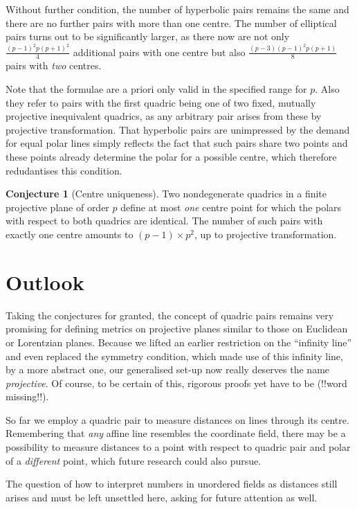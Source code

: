 \documentclass[12pt,english,paper=a4,DIV=12,headings=small,numbers=noenddot,parskip=half]{scrartcl}
\theoremstyle{definition}
\newtheorem{conj}{Conjecture}
\begin{document}
Without further condition, the number of hyperbolic pairs remains the same and there are no further pairs with more than one centre. The number of elliptical pairs turns out to be significantly larger, as there now are not only $\frac{(p-1)^2p(p+1)^2}{4}$ additional pairs with one centre but also $\frac{(p-3)(p-1)^2p(p+1)}{8}$ pairs with \emph{two} centres.

Note that the formulae are a priori only valid in the specified range for $p$. Also they refer to pairs with the first quadric being one of two fixed, mutually projective inequivalent quadrics, as any arbitrary pair arises from these by projective transformation. That hyperbolic pairs are unimpressed by the demand for equal polar lines simply reflects the fact that such pairs share two points and these points already determine the polar for a possible centre, which therefore redudantises this condition. 

\begin{conj}[Centre uniqueness]
Two nondegenerate quadrics in a finite projective plane of order $p$ define at most \emph{one} centre point for which the polars with respect to both quadrics are identical. The number of such pairs with exactly one centre amounts to $(p-1)\times p^2$, up to projective transformation.
\end{conj}

\section{Outlook}
Taking the conjectures for granted, the concept of quadric pairs remains very promising for defining metrics on projective planes similar to those on Euclidean or Lorentzian planes. Because we lifted an earlier restriction on the ``infinity line'' and even replaced the symmetry condition, which made use of this infinity line, by a more abstract one, our generalised set-up now really deserves the name \emph{projective}. Of course, to be certain of this, rigorous proofs yet have to be (!!word missing!!).

So far we employ a quadric pair to measure distances on lines through its centre. Remembering that \emph{any} affine line resembles the coordinate field, there may be a possibility to measure distances to a point with respect to quadric pair and polar of a \emph{different} point, which future research could also pursue.

The question of how to interpret numbers in unordered fields as distances still arises and must be left unsettled here, asking for future attention as well.



\end{document}
